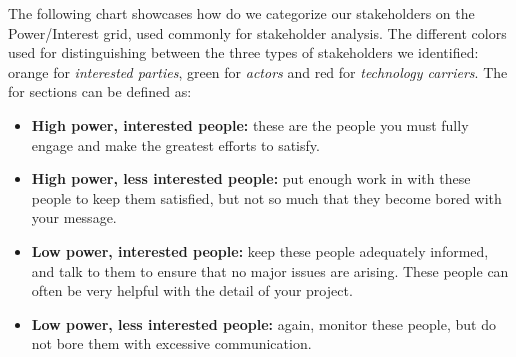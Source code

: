 The following chart showcases how do we categorize our stakeholders on the Power/Interest grid, used commonly for stakeholder analysis.
The different colors used for distinguishing between the three types of stakeholders we identified: orange for \textit{interested parties}, green for \textit{actors} and red for \textit{technology carriers}.
The for sections can be defined as:
\begin{itemize}
	\item \textbf{High power, interested people:} these are the people you must fully engage and make the greatest efforts to satisfy.
	\item \textbf{High power, less interested people:} put enough work in with these people to keep them satisfied, but not so much that they become bored with your message.
	\item \textbf{Low power, interested people:} keep these people adequately informed, and talk to them to ensure that no major issues are arising. These people can often be very helpful with the detail of your project.
	\item \textbf{Low power, less interested people:} again, monitor these people, but do not bore them with excessive communication.
\end{itemize}